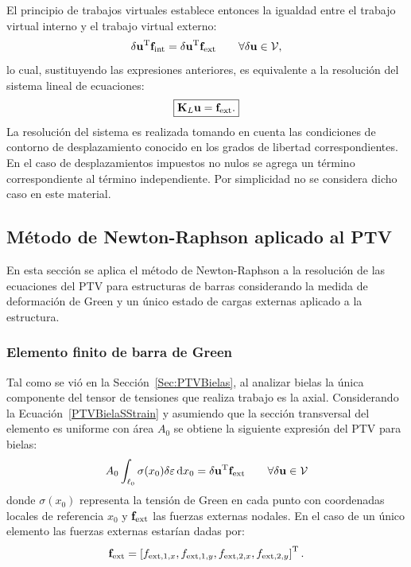 El principio de trabajos virtuales establece entonces la igualdad entre el trabajo virtual interno y el trabajo virtual externo:
\begin{equation}
\delta {\bf u}^{\text{T}} {\bf f}_{\text{int}} =
\delta {\bf u}^{\text{T}} {\bf f}_{\text{ext}}  \qquad \forall \delta {\bf u} \in {\mathcal V},
\end{equation}
lo cual, sustituyendo las expresiones anteriores, es equivalente a la resolución del sistema lineal de ecuaciones:
%
\begin{equation}
\boxed{
	{\bf K}_L {\bf u} = {\bf f}_{\text{ext}}.
}
\end{equation}
La resolución del sistema es realizada tomando en cuenta las condiciones de contorno de desplazamiento conocido en los grados de libertad correspondientes. %
%
En el caso de desplazamientos impuestos no nulos se agrega un término correspondiente al término independiente. Por simplicidad no se considera dicho caso en este material. %


\subsection{Método de Newton-Raphson aplicado al PTV}

En esta sección se aplica el método de Newton-Raphson a la resolución de las ecuaciones del PTV para estructuras de barras considerando la medida de deformación de Green y un único estado de cargas externas aplicado a la estructura.

\subsubsection{Elemento finito de barra de Green}

Tal como se vió en la Sección~\ref{Sec:PTVBielas}, al analizar bielas la única componente del tensor de tensiones que realiza trabajo es la axial. %
%
Considerando la Ecuación~\eqref{PTVBielaSStrain} y asumiendo que la sección transversal del elemento es uniforme con área $A_0$ se obtiene la siguiente expresión del PTV para bielas:
%
\begin{equation}\label{eqn:ptvbielaA0}
A_0 \int_{\ell_0} \sigma(x_0) \delta \varepsilon \, {\text{d}} x_0 = \delta {\bf u}^{\text{T}} {\bf f}_{\text{ext}}   \qquad \forall \delta {\bf u} \in {\mathcal V}
\end{equation}
%
donde $\sigma(x_0)$ representa la tensión de Green en cada punto con coordenadas locales de referencia $x_0$ y ${\bf f}_{\text{ext}}$ las fuerzas externas nodales. %
%
En el caso de un único elemento las fuerzas externas estarían dadas por:
%
\begin{equation}
{\bf f}_{\text{ext}} = \left[ f_{\text{ext},1,x}, f_{\text{ext},1,y}, f_{\text{ext},2,x}, f_{\text{ext},2,y} \right]^{\text{T}}.
\end{equation}

